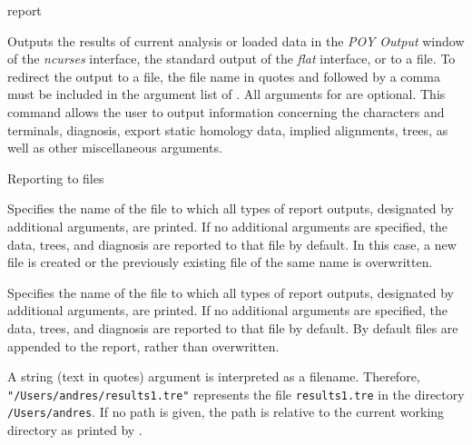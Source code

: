 
\begin{command}{report}{}


\begin{poydescription} 
Outputs the results of current analysis or loaded data in the \emph{POY Output}
window of the \emph{ncurses} interface, the standard output of the \emph{flat}
interface, or to a file. To redirect the output to a file, the file name in 
quotes and followed by a comma must be included in the argument list
of . All arguments for  are
optional. This command allows the user to output information concerning the 
characters and terminals, diagnosis, export static homology data, implied 
alignments, trees, as well as other miscellaneous arguments.
\end{poydescription}

\begin{arguments}

\begin{argumentgroup}{Reporting to files}{}

{Specifies the name of the file to which all types of report outputs,
designated by additional arguments, are printed. If no additional arguments
are specified, the data, trees, and diagnosis are reported to that file by
default. In this case, a new file is created or the previously 
existing file of the same name is overwritten.} 
{}

{Specifies the name of the file to which all types of report outputs,
designated by additional arguments, are printed. If no additional arguments
are specified, the data, trees, and diagnosis are reported to that file by
default. By default files are appended to the report, rather than overwritten.

\setlength{\parindent}{0.5cm}                
\indent 
A string (text in quotes) argument is interpreted as a filename.
Therefore, \texttt{"/Users/andres/results1.tre"} represents the file \texttt{results1.tre} in
the directory \texttt{/Users/andres}. If no path is given, the path
is relative to the current working directory as printed by .} 
{}

\end{argumentgroup}


\end{arguments}
\end{command}
